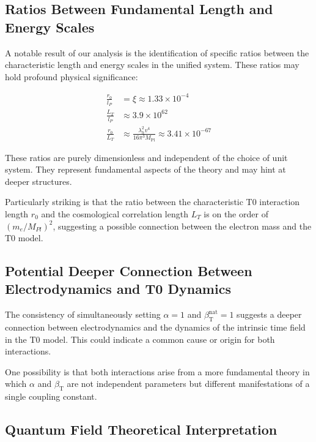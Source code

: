 \documentclass[12pt,a4paper]{article}
\newcommand{\betaT}{\beta_{\text{T}}}
\newcommand{\Mpl}{M_{\text{Pl}}}
\begin{document}
	\subsection{Ratios Between Fundamental Length and Energy Scales}
	
	A notable result of our analysis is the identification of specific ratios between the characteristic length and energy scales in the unified system. These ratios may hold profound physical significance:
	
	\begin{tcolorbox}[colback=blue!5!white,colframe=blue!75!black,title=Fundamental Ratios in the Unified Unit System]
		\begin{align}
			\frac{r_0}{l_P} &= \xi \approx 1.33 \times 10^{-4} \\
			\frac{L_T}{l_P} &\approx 3.9 \times 10^{62} \\
			\frac{r_0}{L_T} &\approx \frac{\lambda_h^2 v^4}{16\pi^3 \Mpl} \approx 3.41 \times 10^{-67}
		\end{align}
	\end{tcolorbox}
	
	These ratios are purely dimensionless and independent of the choice of unit system. They represent fundamental aspects of the theory and may hint at deeper structures.
	
	Particularly striking is that the ratio between the characteristic T0 interaction length \(r_0\) and the cosmological correlation length \(L_T\) is on the order of \((m_e/M_{Pl})^2\), suggesting a possible connection between the electron mass and the T0 model.
	
	\subsection{Potential Deeper Connection Between Electrodynamics and T0 Dynamics}
	
	The consistency of simultaneously setting \(\alpha = 1\) and \(\betaT^{\text{nat}} = 1\) suggests a deeper connection between electrodynamics and the dynamics of the intrinsic time field in the T0 model. This could indicate a common cause or origin for both interactions.
	
	One possibility is that both interactions arise from a more fundamental theory in which \(\alpha\) and \(\betaT\) are not independent parameters but different manifestations of a single coupling constant.
	
	\subsection{Quantum Field Theoretical Interpretation}
	
\end{document}
